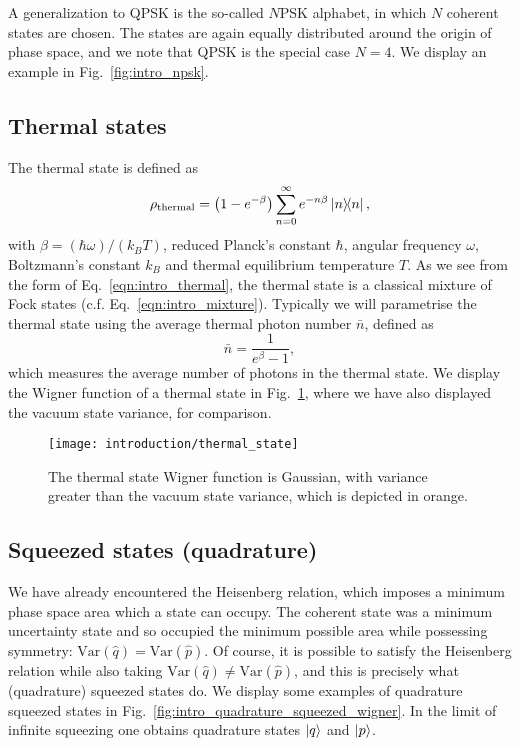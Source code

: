 A generalization to QPSK is the so-called $N$PSK alphabet, in which $N$ coherent states are chosen. The states are again equally distributed around the origin of phase space, and we note that QPSK is the special case $N=4$. We display an example in Fig.~\ref{fig:intro_npsk}.



\FloatBarrier
\subsection{Thermal states}\label{sec:intro_thermal}

The thermal state is defined as
\begin{equation}\label{eqn:intro_thermal}
\rho_{\text{thermal}} = \left( 1 - e^{-\beta} \right) \sum_{n=0}^\infty e^{- n \beta} \dyad{n},
\end{equation}
with $\beta = \left( \hbar \omega \right)/\left(k_B T\right)$, reduced Planck's constant $\hbar$, angular frequency $\omega$, Boltzmann's constant $k_B$ and thermal equilibrium temperature $T$. As we see from the form of Eq.~\ref{eqn:intro_thermal}, the thermal state is a classical mixture of Fock states (c.f. Eq.~\ref{eqn:intro_mixture}). Typically we will parametrise the thermal state using the average thermal photon number $\bar{n}$, defined as 
\begin{equation}
\bar{n} = \frac{1}{e^\beta - 1},
\end{equation}
which measures the average number of photons in the thermal state. We display the Wigner function of a thermal state in Fig.~\ref{fig:thermal_state}, where we have also displayed the vacuum state variance, for comparison.


\begin{figure}[htp]
\captionsetup{width=0.8\linewidth}
\centering
\texttt{[image: introduction/thermal\_state]}
\caption{\label{fig:thermal_state} The thermal state Wigner function is Gaussian, with variance greater than the vacuum state variance, which is depicted in orange.}
\end{figure}

\FloatBarrier
\subsection{Squeezed states (quadrature)}

We have already encountered the Heisenberg relation, which imposes a minimum phase space area which a state can occupy. The coherent state was a minimum uncertainty state and so occupied the minimum possible area while possessing symmetry: $\text{Var}\left( \hat{q}\right) = \text{Var}\left(\hat{p}\right)$. Of course, it is possible to satisfy the Heisenberg relation while also taking $\text{Var}\left(\hat{q}\right) \ne \text{Var}\left(\hat{p}\right)$, and this is precisely what (quadrature) squeezed states do. We display some examples of quadrature squeezed states in Fig.~\ref{fig:intro_quadrature_squeezed_wigner}. In the limit of infinite squeezing one obtains quadrature states $\ket{q}$ and $\ket{p}$.

